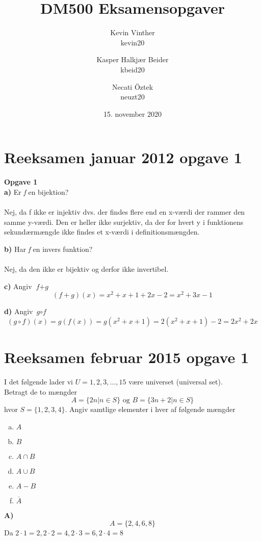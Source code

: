 \documentclass{article}
\title{DM500 Eksamensopgaver}
\author{ Kevin Vinther\\kevin20 \and Kasper Halkjær Beider\\kbeid20 \and Necati Öztek\\neuzt20}
\date{15. november 2020}
\begin{document}
\maketitle

\newpage

\section{Reeksamen januar 2012 opgave 1}
\textbf{Opgave 1}\\

\textbf{a)} Er \textit{f} en bijektion?\\
\\Nej, da f ikke er injektiv dvs. der findes flere end en x-værdi der rammer den samme y-værdi. Den er heller ikke surjektiv, da der for hvert y i funktionens sekundærmængde ikke findes et x-værdi i definitionsmængden.

\textbf{b)} Har \textit{f} en invers funktion?\\
\\Nej, da den ikke er bijektiv og derfor ikke invertibel.

\textbf{c)} Angiv $\textit{f} + \textit{g}$
\[(f+g)(x)=x^2+x+1+2x-2=x^2+3x-1\]

\textbf{d)} Angiv $\textit{g} \circ \textit{f}$
\[(g \circ f)(x)=g(f(x))=g(x^2+x+1)=2(x^2+x+1)-2=2x^2+2x\]
\section{Reeksamen februar 2015 opgave 1}
I det følgende lader vi $U = {1, 2, 3, ...,15}$ være universet (universal set). \\
Betragt de to mængder
$$A = \{2n | n \in S\} \textrm{ og } B = \{3n+2|n\in S\}$$
hvor $S = \{1, 2, 3, 4\}$.
Angiv samtlige elementer i hver af følgende mængder
\begin{enumerate}[a)]
    \item $A$
    \item $B$
    \item $A \cap B$
    \item $A \cup B$
    \item $A - B$
    \item $\overline{A}$
\end{enumerate}

\textbf{A)}\\
$$A = \{2, 4, 6, 8\}$$
Da $2\cdot1 = 2, 2\cdot2 = 4, 2\cdot 3 = 6, 2\cdot4 = 8$\\
\end{document}
